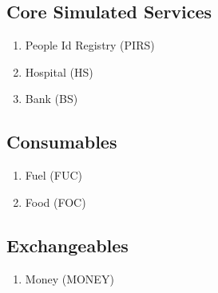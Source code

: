 \subsection{Core Simulated Services} 
\begin{enumerate}
\item People Id Registry (PIRS)
\item Hospital (HS)
\item Bank (BS)
\end{enumerate}

\subsection{Consumables} 
\begin{enumerate}
\item Fuel (FUC)
\item Food (FOC)
\end{enumerate}

\subsection{Exchangeables} 
\begin{enumerate}
\item Money (MONEY)
\end{enumerate}


